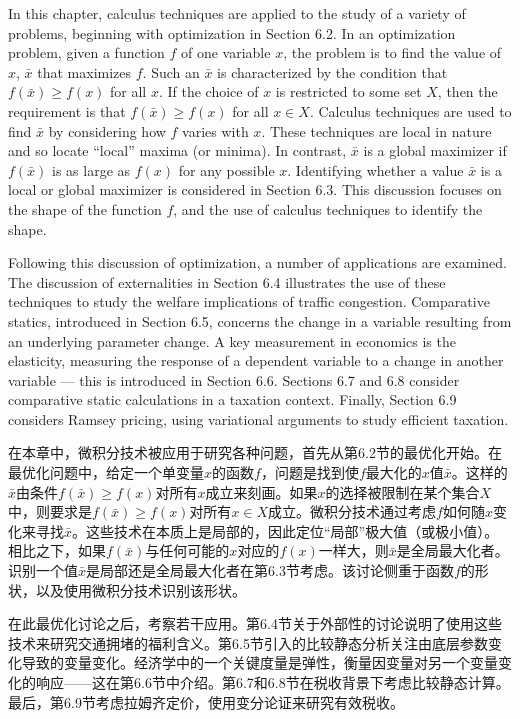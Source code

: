 \begin{original}
In this chapter, calculus techniques are applied to the study of a variety of problems, beginning with optimization in Section 6.2. In an optimization problem, given a function $f$ of one variable $x$, the problem is to find the value of $x$, $\bar{x}$ that maximizes $f$. Such an $\bar{x}$ is characterized by the condition that $f(\bar{x}) \ge f(x)$ for all $x$. If the choice of $x$ is restricted to some set $X$, then the requirement is that $f(\bar{x}) \ge f(x)$ for all $x \in X$. Calculus techniques are used to find $\bar{x}$ by considering how $f$ varies with $x$. These techniques are local in nature and so locate ``local'' maxima (or minima). In contrast, $\bar{x}$ is a global maximizer if $f(\bar{x})$ is as large as $f(x)$ for any possible $x$. Identifying whether a value $\bar{x}$ is a local or global maximizer is considered in Section 6.3. This discussion focuses on the shape of the function $f$, and the use of calculus techniques to identify the shape.

Following this discussion of optimization, a number of applications are examined. The discussion of externalities in Section 6.4 illustrates the use of these techniques to study the welfare implications of traffic congestion. Comparative statics, introduced in Section 6.5, concerns the change in a variable resulting from an underlying parameter change. A key measurement in economics is the elasticity, measuring the response of a dependent variable to a change in another variable --- this is introduced in Section 6.6. Sections 6.7 and 6.8 consider comparative static calculations in a taxation context. Finally, Section 6.9 considers Ramsey pricing, using variational arguments to study efficient taxation.
\end{original}
\begin{translation}
在本章中，微积分技术被应用于研究各种问题，首先从第6.2节的最优化开始。在最优化问题中，给定一个单变量$x$的函数$f$，问题是找到使$f$最大化的$x$值$\bar{x}$。这样的$\bar{x}$由条件$f(\bar{x}) \ge f(x)$对所有$x$成立来刻画。如果$x$的选择被限制在某个集合$X$中，则要求是$f(\bar{x}) \ge f(x)$对所有$x \in X$成立。微积分技术通过考虑$f$如何随$x$变化来寻找$\bar{x}$。这些技术在本质上是局部的，因此定位``局部''极大值（或极小值）。相比之下，如果$f(\bar{x})$与任何可能的$x$对应的$f(x)$一样大，则$\bar{x}$是全局最大化者。识别一个值$\bar{x}$是局部还是全局最大化者在第6.3节考虑。该讨论侧重于函数$f$的形状，以及使用微积分技术识别该形状。

在此最优化讨论之后，考察若干应用。第6.4节关于外部性的讨论说明了使用这些技术来研究交通拥堵的福利含义。第6.5节引入的比较静态分析关注由底层参数变化导致的变量变化。经济学中的一个关键度量是弹性，衡量因变量对另一个变量变化的响应——这在第6.6节中介绍。第6.7和6.8节在税收背景下考虑比较静态计算。最后，第6.9节考虑拉姆齐定价，使用变分论证来研究有效税收。
\end{translation}


